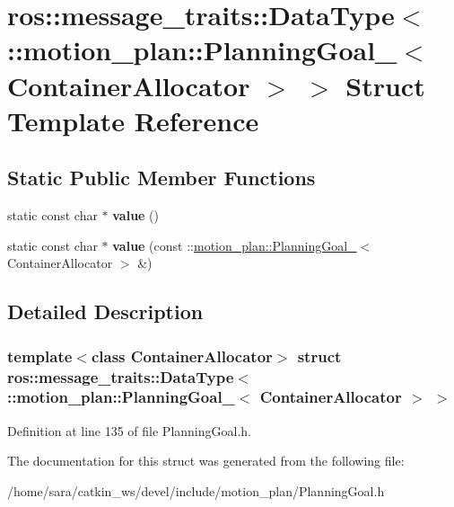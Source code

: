 \hypertarget{structros_1_1message__traits_1_1DataType_3_01_1_1motion__plan_1_1PlanningGoal___3_01ContainerAllocator_01_4_01_4}{}\section{ros\+:\+:message\+\_\+traits\+:\+:Data\+Type$<$ \+:\+:motion\+\_\+plan\+:\+:Planning\+Goal\+\_\+$<$ Container\+Allocator $>$ $>$ Struct Template Reference}
\label{structros_1_1message__traits_1_1DataType_3_01_1_1motion__plan_1_1PlanningGoal___3_01ContainerAllocator_01_4_01_4}
\subsection*{Static Public Member Functions}
\begin{DoxyCompactItemize}
\item 
\mbox{\label{structros_1_1message__traits_1_1DataType_3_01_1_1motion__plan_1_1PlanningGoal___3_01ContainerAllocator_01_4_01_4_a0f87337c0f23693b929a55a18ca9b78f}} 
static const char $\ast$ {\bfseries value} ()
\item 
\mbox{\label{structros_1_1message__traits_1_1DataType_3_01_1_1motion__plan_1_1PlanningGoal___3_01ContainerAllocator_01_4_01_4_a4c95be9c5460ab9d2de40094eb73ddd3}} 
static const char $\ast$ {\bfseries value} (const \+::\hyperlink{structmotion__plan_1_1PlanningGoal__}{motion\+\_\+plan\+::\+Planning\+Goal\+\_\+}$<$ Container\+Allocator $>$ \&)
\end{DoxyCompactItemize}


\subsection{Detailed Description}
\subsubsection*{template$<$class Container\+Allocator$>$\newline
struct ros\+::message\+\_\+traits\+::\+Data\+Type$<$ \+::motion\+\_\+plan\+::\+Planning\+Goal\+\_\+$<$ Container\+Allocator $>$ $>$}



Definition at line 135 of file Planning\+Goal.\+h.



The documentation for this struct was generated from the following file\+:\begin{DoxyCompactItemize}
\item 
/home/sara/catkin\+\_\+ws/devel/include/motion\+\_\+plan/Planning\+Goal.\+h\end{DoxyCompactItemize}
